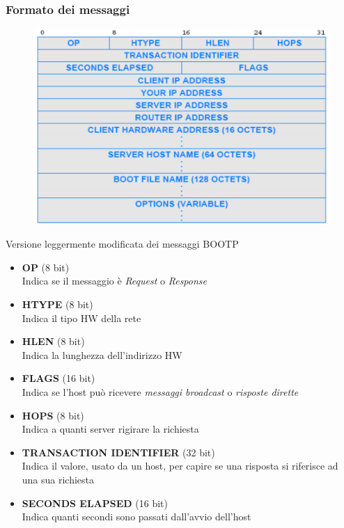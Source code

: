 \documentclass{article}
\begin{document}
            \subsubsection{Formato dei messaggi}
                \begin{figure}[H]
                    \centering
                    \includegraphics[width=\textwidth]{pic/messaggio_dhcp.png}
                    \label{Messaggio DHCP}
                \end{figure}
                Versione leggermente modificata dei messaggi BOOTP
                \begin{itemize}
                    \item \textbf{OP} (8 bit)\\ 
                          Indica se il messaggio è \textit{Request} o \textit{Response}
                    \item \textbf{HTYPE} (8 bit)\\
                          Indica il tipo HW della rete
                    \item \textbf{HLEN} (8 bit)\\
                          Indica la lunghezza dell'indirizzo HW
                    \item \textbf{FLAGS} (16 bit)\\
                          Indica se l'host può ricevere \textit{messaggi broadcast} o \textit{risposte dirette}
                    \item \textbf{HOPS} (8 bit)\\
                          Indica a quanti server rigirare la richiesta
                    \item \textbf{TRANSACTION IDENTIFIER} (32 bit)\\
                          Indica il valore, usato da un host, per capire se una risposta si riferisce ad una sua richiesta
                    \item \textbf{SECONDS ELAPSED} (16 bit)\\
                          Indica quanti secondi sono passati dall'avvio dell'host
                \end{itemize}
\end{document}
